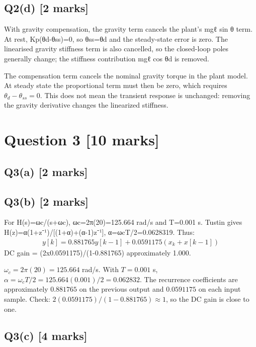 \documentclass[11pt,a4paper]{article}
\begin{document}
\subsection*{Q2(d) \hfill [2 marks]}

With gravity compensation, the gravity term cancels the plant's mgℓ sin θ term.
At rest, Kp(θd-θss)=0, so θss=θd and the steady-state error is zero.
The linearised gravity stiffness term is also cancelled, so the closed-loop poles generally change; the stiffness contribution mgℓ cos θd is removed.\par\smallskip The compensation term cancels the nominal gravity torque in the plant model. At steady state the proportional term must then be zero, which requires $\theta_d-\theta_{ss}=0$. This does not mean the transient response is unchanged: removing the gravity derivative changes the linearized stiffness.

\section*{Question 3 \hfill [10 marks]}
\subsection*{Q3(a) \hfill [2 marks]}

\vspace{2mm}

\subsection*{Q3(b) \hfill [2 marks]}

For H(s)=ωc/(s+ωc), ωc=2π(20)=125.664 rad/s and T=0.001 s.
Tustin gives H(z)=α(1+z⁻¹)/[(1+α)+(α-1)z⁻¹], α=ωcT/2=0.0628319.
Thus:\[\begin{aligned}y[k]=0.881765y[k-1]+0.0591175(x_k+x[k-1])\end{aligned}\]
DC gain = (2x0.0591175)/(1-0.881765) approximately 1.000.\par\smallskip $\omega_c=2\pi(20)=125.664$ rad/s. With $T=0.001$ s, $\alpha=\omega_cT/2=125.664(0.001)/2=0.062832$. The recurrence coefficients are approximately $0.881765$ on the previous output and $0.0591175$ on each input sample. Check: $2(0.0591175)/(1-0.881765)\approx1$, so the DC gain is close to one.

\subsection*{Q3(c) \hfill [4 marks]}
\end{document}
